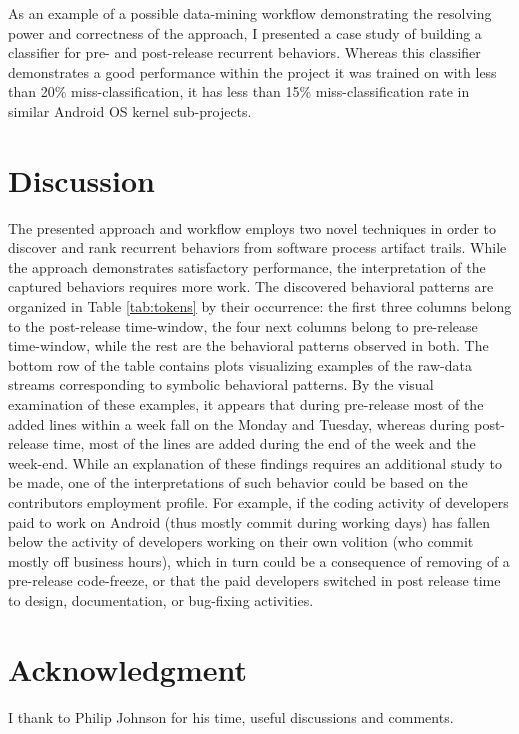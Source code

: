 \documentclass[conference]{worldcomp}
\begin{document}
As an example of a possible data-mining workflow demonstrating the resolving power 
and correctness of the approach, I presented a case study of building a classifier
for pre- and post-release recurrent behaviors. 
Whereas this classifier demonstrates a good performance within the project it was 
trained on with less than 20\% miss-classification, it has less than 15\% 
miss-classification rate in similar Android OS kernel sub-projects.


\section{Discussion}
The presented approach and workflow employs two novel techniques in order to discover and 
rank recurrent behaviors from software process artifact trails. While the approach 
demonstrates satisfactory performance, the interpretation of the captured behaviors requires
more work. 
The discovered behavioral patterns are organized in Table \ref{tab:tokens} by their 
occurrence: the first three columns belong to the post-release time-window, the four next 
columns belong to pre-release time-window, while the rest are the behavioral patterns observed 
in both. 
The bottom row of the table contains plots visualizing examples of the raw-data streams 
corresponding to symbolic behavioral patterns. By the visual examination of these examples, 
it appears that during pre-release most of the added lines within a week fall on the 
Monday and Tuesday, whereas during post-release time, most of the lines are added during the 
end of the week and the week-end. While an explanation of these findings requires an additional
study to be made, one of the interpretations of such behavior could be based on the 
contributors employment profile. For example, if the coding activity of developers paid 
to work on Android (thus mostly commit during working days) has fallen below the activity of 
developers working on their own volition (who commit mostly off business hours), which in turn 
could be a consequence of removing of a pre-release code-freeze, or that the paid developers 
switched in post release time to design, documentation, or bug-fixing activities.

\section{Acknowledgment}
I thank to Philip Johnson for his time, useful discussions and comments.
\end{document}
